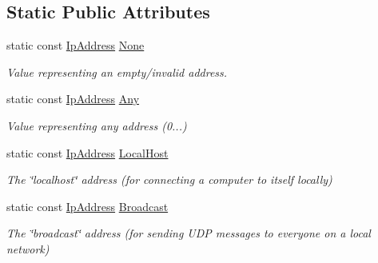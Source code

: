 \subsection*{Static Public Attributes}
\begin{DoxyCompactItemize}
\item 
\mbox{\label{classsf_1_1_ip_address_a4619b4abbe3c8fef056e7299db967404}} 
static const \hyperlink{classsf_1_1_ip_address}{Ip\+Address} \hyperlink{classsf_1_1_ip_address_a4619b4abbe3c8fef056e7299db967404}{None}
\begin{DoxyCompactList}\small\item\em Value representing an empty/invalid address. \end{DoxyCompactList}\item 
\mbox{\label{classsf_1_1_ip_address_a3dbc10b0dc6804cc69e29342f7406907}} 
static const \hyperlink{classsf_1_1_ip_address}{Ip\+Address} \hyperlink{classsf_1_1_ip_address_a3dbc10b0dc6804cc69e29342f7406907}{Any}
\begin{DoxyCompactList}\small\item\em Value representing any address (0...) \end{DoxyCompactList}\item 
\mbox{\label{classsf_1_1_ip_address_a594d3a8e2559f8fa8ab0a96fa597333b}} 
static const \hyperlink{classsf_1_1_ip_address}{Ip\+Address} \hyperlink{classsf_1_1_ip_address_a594d3a8e2559f8fa8ab0a96fa597333b}{Local\+Host}
\begin{DoxyCompactList}\small\item\em The \char`\"{}localhost\char`\"{} address (for connecting a computer to itself locally) \end{DoxyCompactList}\item 
\mbox{\label{classsf_1_1_ip_address_aa93d1d57b65d243f2baf804b6035465c}} 
static const \hyperlink{classsf_1_1_ip_address}{Ip\+Address} \hyperlink{classsf_1_1_ip_address_aa93d1d57b65d243f2baf804b6035465c}{Broadcast}
\begin{DoxyCompactList}\small\item\em The \char`\"{}broadcast\char`\"{} address (for sending U\+DP messages to everyone on a local network) \end{DoxyCompactList}\end{DoxyCompactItemize}
